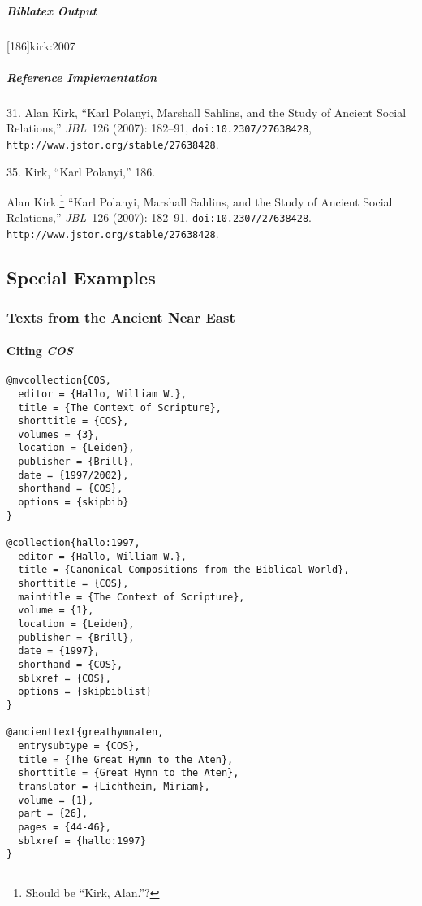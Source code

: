 \documentclass[a4paper]{article}
\newenvironment{biboutput}{%
  \subparagraph{Biblatex Output}
}{\color{black}}
\newenvironment{refimp}{%
  \subparagraph{Reference Implementation}
  \color{reference-colour}
  \rm
}{\par\color{black}}
\begin{document}
\begin{biboutput}
  [186]{kirk:2007}
\end{biboutput}

\begin{refimp}
  \hspace*{\bibindent}31. Alan Kirk, “Karl Polanyi, Marshall Sahlins, and the
  Study of Ancient Social Relations,” \emph{JBL}~126 (2007): 182–91,
  \nolinkurl{doi:10.2307/27638428},
  \nolinkurl{http://www.jstor.org/stable/27638428}.

  \hspace*{\bibindent}35. Kirk, “Karl Polanyi,” 186.

  \hangindent\bibindent Alan Kirk.\footnote{Should be “Kirk, Alan.”?} “Karl
  Polanyi, Marshall Sahlins, and the Study of Ancient Social Relations,”
  \emph{JBL}~126 (2007): 182–91. \nolinkurl{doi:10.2307/27638428}.
  \nolinkurl{http://www.jstor.org/stable/27638428}.

\end{refimp}

\subsection{Special Examples}

\subsubsection{Texts from the Ancient Near East}

\paragraph{Citing \textsl{COS}}

\begin{lstlisting}
@mvcollection{COS,
  editor = {Hallo, William W.},
  title = {The Context of Scripture},
  shorttitle = {COS},
  volumes = {3},
  location = {Leiden},
  publisher = {Brill},
  date = {1997/2002},
  shorthand = {COS},
  options = {skipbib}
}

@collection{hallo:1997,
  editor = {Hallo, William W.},
  title = {Canonical Compositions from the Biblical World},
  shorttitle = {COS},
  maintitle = {The Context of Scripture},
  volume = {1},
  location = {Leiden},
  publisher = {Brill},
  date = {1997},
  shorthand = {COS},
  sblxref = {COS},
  options = {skipbiblist}
}

@ancienttext{greathymnaten,
  entrysubtype = {COS},
  title = {The Great Hymn to the Aten},
  shorttitle = {Great Hymn to the Aten},
  translator = {Lichtheim, Miriam},
  volume = {1},
  part = {26},
  pages = {44-46},
  sblxref = {hallo:1997}
}
\end{lstlisting}
\end{document}
